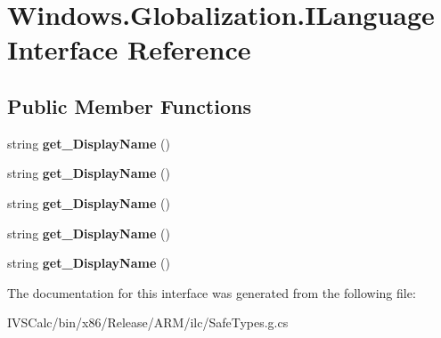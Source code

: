 \hypertarget{interface_windows_1_1_globalization_1_1_i_language}{}\section{Windows.\+Globalization.\+I\+Language Interface Reference}
\label{interface_windows_1_1_globalization_1_1_i_language}
\subsection*{Public Member Functions}
\begin{DoxyCompactItemize}
\item 
\mbox{\label{interface_windows_1_1_globalization_1_1_i_language_a056f2363f79455a233be76262df0008b}} 
string {\bfseries get\+\_\+\+Display\+Name} ()
\item 
\mbox{\label{interface_windows_1_1_globalization_1_1_i_language_a056f2363f79455a233be76262df0008b}} 
string {\bfseries get\+\_\+\+Display\+Name} ()
\item 
\mbox{\label{interface_windows_1_1_globalization_1_1_i_language_a056f2363f79455a233be76262df0008b}} 
string {\bfseries get\+\_\+\+Display\+Name} ()
\item 
\mbox{\label{interface_windows_1_1_globalization_1_1_i_language_a056f2363f79455a233be76262df0008b}} 
string {\bfseries get\+\_\+\+Display\+Name} ()
\item 
\mbox{\label{interface_windows_1_1_globalization_1_1_i_language_a056f2363f79455a233be76262df0008b}} 
string {\bfseries get\+\_\+\+Display\+Name} ()
\end{DoxyCompactItemize}


The documentation for this interface was generated from the following file\+:\begin{DoxyCompactItemize}
\item 
I\+V\+S\+Calc/bin/x86/\+Release/\+A\+R\+M/ilc/Safe\+Types.\+g.\+cs\end{DoxyCompactItemize}
